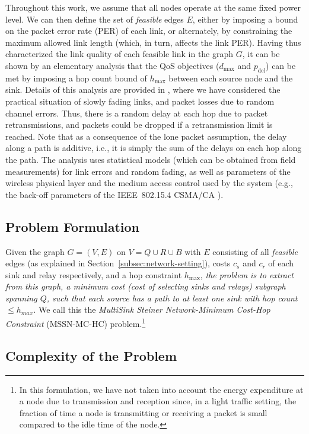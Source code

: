 \documentclass[conference]{IEEEtran}
\begin{document}
Throughout this work, we assume that all nodes operate at the same fixed power level. We can then define the set of \emph{feasible} edges $E$, either by imposing a bound on the packet error rate (PER) of each link, or alternately, by constraining the maximum allowed link length (which, in turn, affects the link PER). Having thus characterized the link quality of each feasible link in the graph $G$, it can be shown by an elementary analysis that the QoS objectives ($d_{\max}$ and $p_{\mathrm{del}}$) can be met by imposing a hop count bound of $h_{\max}$ between each source node and the sink.  Details of this analysis are provided in \cite{fullpaper}, where we have considered the practical situation of slowly fading links, and packet losses due to random channel errors. Thus, there is a random delay at each hop due to packet retransmissions, and packets could be dropped if a retransmission limit is reached. Note that as a consequence of the lone packet assumption, the delay along a path is additive, i.e., it is simply the sum of the delays on each hop along the path. The analysis uses statistical models (which can be obtained from field measurements) for link errors and random fading, as well as parameters of the wireless physical layer and the medium access control used by the system (e.g., the back-off parameters of the IEEE~802.15.4 CSMA/CA \cite{IEEE}). 

\subsection{Problem Formulation}
\label{subsec:formulation}

Given the graph $G= (V, E)$ on $V= Q\cup R\cup B$ with $E$ consisting of all \emph{feasible} edges (as explained in Section~\ref{subsec:network-setting}), costs $c_s$ and $c_r$ of each sink and relay respectively, and a hop constraint $h_{\max}$, \emph{the problem is to extract from this graph, a minimum cost (cost of selecting sinks and relays) subgraph spanning $Q$, such that each source has a path to at least one sink with hop count $\leq h_{max}$.} We call this the \emph{MultiSink Steiner Network-Minimum Cost-Hop Constraint} (MSSN-MC-HC) problem.\footnote{In this formulation, we have not taken into account the energy expenditure at a node due to transmission and reception since, in a light traffic setting, the fraction of time a node is transmitting or receiving a packet is small compared to the idle time of the node.}


\subsection{Complexity of the Problem}
\end{document}
